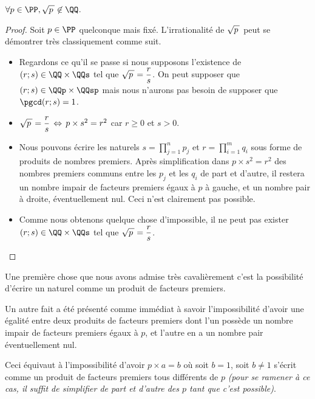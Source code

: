 \begin{fact}
	$\forall p \in \PP, \sqrtp \not\in \QQ$.
\end{fact}

\begin{proof}
	Soit $p \in \PP$ quelconque mais fixé. L'irrationalité de $\sqrtp$ peut se démontrer très classiquement comme suit.
	
	\begin{itemize}[label=\small\textbullet]
		\item Regardons ce qu'il se passe si nous supposons l'existence de $(r ; s) \in \QQ \times \QQs$ tel que $\sqrtp = \dfrac{r}{s}$. On peut supposer que $(r ; s) \in \QQp \times \QQsp$ mais nous n'aurons pas besoin de supposer que $\pgcd(r ; s) = 1$.

	
		\item $\sqrtp = \dfrac{r}{s} \, \Leftrightarrow \, p \times s^2 = r^2$ car $r \geq 0$ et $s > 0$.
	
		\item Nous pouvons écrire les naturels
		$\displaystyle s = \prod_{j=1}^{n} p_j$
		et
		$\displaystyle r = \prod_{i=1}^{m} q_i$
		sous forme de produits de nombres premiers.
		Après simplification dans $p \times s^2 = r^2$ des nombres premiers communs entre les $p_j$ et les $q_i$ de part et d'autre, il restera un nombre impair de facteurs premiers égaux à $p$ à gauche, et un nombre pair à droite, éventuellement nul. 
		Ceci n'est clairement pas possible. 

	
		\item Comme nous obtenons quelque chose d'impossible, il ne peut pas exister $(r ; s) \in \QQ \times \QQs$ tel que $\sqrtp = \dfrac{r}{s}$.
	\end{itemize}
\end{proof}


\begin{unproved}
	Une première chose que nous avons admise très cavalièrement c'est la possibilité d'écrire un naturel comme un produit de facteurs premiers.
	
\end{unproved}


\begin{unproved}
	Un autre fait a été présenté comme immédiat à savoir l'impossibilité d'avoir une égalité entre deux produits de facteurs premiers dont l'un possède un nombre impair de facteurs premiers égaux à $p$, et l'autre en a un nombre pair éventuellement nul.
	
	\smallskip
	
	Ceci équivaut à l'impossibilité d'avoir $p \times a = b$ où soit $b = 1$, soit $b \neq 1$ s'écrit comme un produit de facteurs premiers tous différents de $p$ \emph{(pour se ramener à ce cas, il suffit de simplifier de part et d'autre des $p$ tant que c'est possible)}.
	
\end{unproved}



